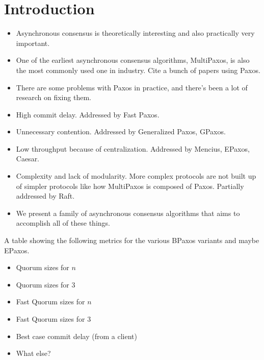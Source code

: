 \section{Introduction}



\begin{itemize}
  \item
    Asynchronous consensus is theoretically interesting and also practically
    very important.

  \item
    One of the earliest asynchronous consensus algorithms, MultiPaxos, is also
    the most commonly used one in industry. Cite a bunch of papers using Paxos.

  \item
    There are some problems with Paxos in practice, and there's been a lot of
    research on fixing them.

  \item
    High commit delay. Addressed by Fast Paxos.

  \item
    Unnecessary contention. Addressed by Generalized Paxos, GPaxos.

  \item
    Low throughput because of centralization. Addressed by Mencius, EPaxos,
    Caesar.

  \item
    Complexity and lack of modularity. More complex protocols are not built up
    of simpler protocols like how MultiPaxos is composed of Paxos. Partially
    addressed by Raft.

  \item
    We present a family of asynchronous consensus algorithms that aims to
    accomplish all of these things.
\end{itemize}

A table showing the following metrics for the various BPaxos variants and maybe
EPaxos.
\begin{itemize}
  \item Quorum sizes for $n$
  \item Quorum sizes for $3$
  \item Fast Quorum sizes for $n$
  \item Fast Quorum sizes for $3$
  \item Best case commit delay (from a client)
  \item What else?
\end{itemize}
